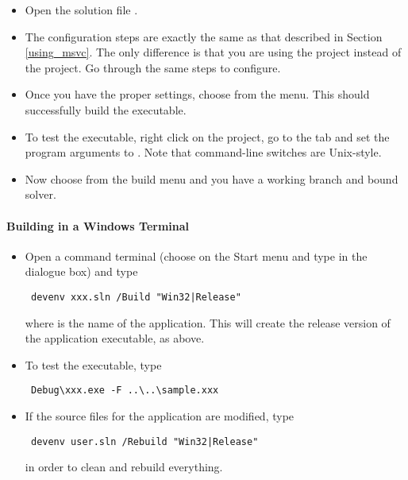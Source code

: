 \begin{itemize}

\item Open the solution file .

\item The configuration steps are exactly the same as that described in
  Section \ref{using_msvc}. The only difference is that you are using the
   project instead of the  project. Go through the
  same steps to configure.

\item Once you have the proper settings, choose  from the  menu. This should successfully 
build the executable.

\item
To test the executable, right click on the  project, go to the
 tab and set the program arguments to 
. Note that command-line switches are 
Unix-style.

\item
Now choose  from the build menu and you have a working branch
and bound solver. 

\end{itemize}

\paragraph{Building in a Windows Terminal}
\begin{itemize}
\item Open a command terminal (choose  on the Start menu and type
 in the dialogue box) and type
{\color{brown}
\begin{verbatim}
 devenv xxx.sln /Build "Win32|Release"
\end{verbatim}
} 
where  is the name of the application. This will create the
release version of the application executable, as above. 

\item To test the executable, type 
{\color{brown}
\begin{verbatim}
 Debug\xxx.exe -F ..\..\sample.xxx
\end{verbatim}
}
\item If the source files for the application are modified, type 
{\color{brown}
\begin{verbatim}
 devenv user.sln /Rebuild "Win32|Release"
\end{verbatim}
}
in order to clean and rebuild everything.
\end{itemize} 

